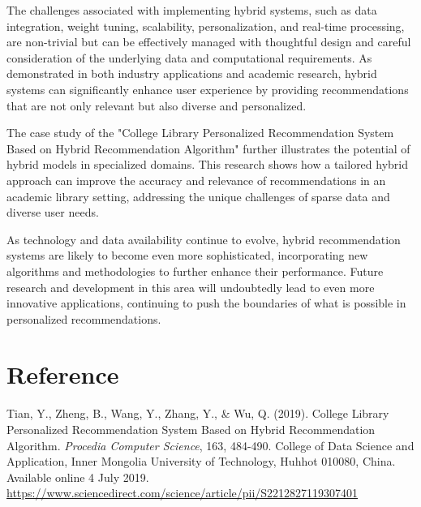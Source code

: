 \documentclass{article}
\begin{document}
The challenges associated with implementing hybrid systems, such as data integration, weight tuning, scalability, personalization, and real-time processing, are non-trivial but can be effectively managed with thoughtful design and careful consideration of the underlying data and computational requirements. As demonstrated in both industry applications and academic research, hybrid systems can significantly enhance user experience by providing recommendations that are not only relevant but also diverse and personalized.

The case study of the "College Library Personalized Recommendation System Based on Hybrid Recommendation Algorithm" further illustrates the potential of hybrid models in specialized domains. This research shows how a tailored hybrid approach can improve the accuracy and relevance of recommendations in an academic library setting, addressing the unique challenges of sparse data and diverse user needs.

As technology and data availability continue to evolve, hybrid recommendation systems are likely to become even more sophisticated, incorporating new algorithms and methodologies to further enhance their performance. Future research and development in this area will undoubtedly lead to even more innovative applications, continuing to push the boundaries of what is possible in personalized recommendations.

\section{Reference}

Tian, Y., Zheng, B., Wang, Y., Zhang, Y., \& Wu, Q. (2019). College Library Personalized Recommendation System Based on Hybrid Recommendation Algorithm. \textit{Procedia Computer Science}, 163, 484-490. College of Data Science and Application, Inner Mongolia University of Technology, Huhhot 010080, China. Available online 4 July 2019. 
\url{https://www.sciencedirect.com/science/article/pii/S2212827119307401}
\end{document}
